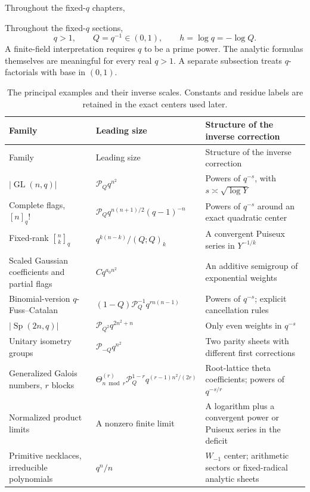 \documentclass[11pt,openany]{book}
\numberwithin{equation}{chapter}
\theoremstyle{plain}
\theoremstyle{definition}
\theoremstyle{remark}
\newcommand{\qbinq}[2]{\genfrac{[}{]}{0pt}{}{#1}{#2}_{q}}   %
\newcommand{\pp}[1]{(Q;Q)_{#1}}
\newcommand{\Pinf}{\mathcal P_Q}
\newcommand{\T}{\Theta}
\newcommand{\GL}{\operatorname{GL}}\newcommand{\Sp}{\operatorname{Sp}}
\begin{document}
Throughout the fixed-$q$ chapters,

Throughout the fixed-$q$ sections,
\begin{equation}\label{t3:eq:qnotation}
 q>1,\qquad Q=q^{-1}\in(0,1),\qquad h=\log q=-\log Q.
\end{equation}
A finite-field interpretation requires $q$ to be a prime power. The analytic formulas themselves are meaningful for every real $q>1$. A separate subsection treats $q$-factorials with base in $(0,1)$.

\begin{longtable}{@{}>{\raggedright\arraybackslash}p{}>{\raggedright\arraybackslash}p{}>{\raggedright\arraybackslash}p{}@{}}
\caption{The principal examples and their inverse scales. Constants and residue labels are retained in the exact centers used later.}\label{t3:tab:map}\\
\toprule
Family & Leading size & Structure of the inverse correction\\
\midrule\endfirsthead
\toprule Family & Leading size & Structure of the inverse correction\\\midrule\endhead
$\lvert\GL(n,q)\rvert$ & $\Pinf q^{n^2}$ & Powers of $q^{-s}$, with $s\asymp\sqrt{\log Y}$\\
Complete flags, $[n]_q!$ & $\Pinf q^{n(n+1)/2}(q-1)^{-n}$ & Powers of $q^{-s}$ around an exact quadratic center\\
Fixed-rank $\qbinq{n}{k}$ & $q^{k(n-k)}/\pp{k}$ & A convergent Puiseux series in $Y^{-1/k}$\\
Scaled Gaussian coefficients and partial flags & $Cq^{a_0n^2}$ & An additive semigroup of exponential weights\\
Binomial-version $q$-Fuss--Catalan & $(1-Q)\Pinf^{-1}q^{r n(n-1)}$ & Powers of $q^{-s}$; explicit cancellation rules\\
$\lvert\Sp(2n,q)\rvert$ & $\mathcal P_{Q^2}q^{2n^2+n}$ & Only even weights in $q^{-s}$\\
Unitary isometry groups & $\mathcal P_{-Q}q^{n^2}$ & Two parity sheets with different first corrections\\
Generalized Galois numbers, $r$ blocks & $\T^{(r)}_{n\bmod r}\Pinf^{1-r}q^{(r-1)n^2/(2r)}$ & Root-lattice theta coefficients; powers of $q^{-s/r}$\\
Normalized product limits & A nonzero finite limit & A logarithm plus a convergent power or Puiseux series in the deficit\\
Primitive necklaces, irreducible polynomials & $q^n/n$ & $W_{-1}$ center; arithmetic sectors or fixed-radical analytic sheets\\
\bottomrule
\end{longtable}
\end{document}
